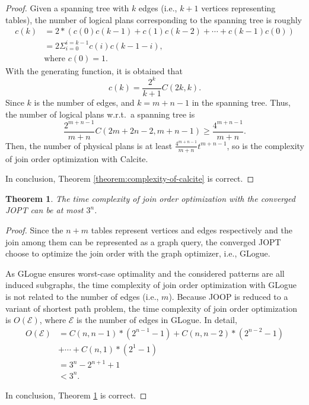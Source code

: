 \documentclass[sigconf, nonacm]{acmart}
\newtheorem{theorem}{Theorem}
\begin{document}
\begin{proof}
    Given a spanning tree with $k$ edges (i.e., $k+1$ vertices representing tables), the number of logical plans corresponding to the spanning tree is roughly
    \begin{equation*}
        \begin{split}
            c(k) & = 2 * (c(0)c(k-1) + c(1)c(k-2) + \cdots + c(k-1)c(0)) \\
            & = 2\Sigma_{i=0}^{i=k-1}c(i)c(k-1-i), \\
            & \text{where } c(0) = 1.
        \end{split}
    \end{equation*}
    With the generating function, it is obtained that 
    \begin{equation*}
        c(k) = \frac{2^k}{k+1}C(2k, k).
    \end{equation*}
    Since $k$ is the number of edges, and $k = m + n - 1$ in the spanning tree.
    Thus, the number of logical plans w.r.t.~a spanning tree is 
    \begin{equation*}
        \frac{2^{m+n-1}}{m+n}C(2m+2n-2, m+n-1) \geq \frac{4^{m+n-1}}{m+n}.
    \end{equation*}
   Then, the number of physical plans is at least $\frac{4^{m+n-1}}{m+n}t^{m+n-1}$, so is the complexity of join order optimization with Calcite.
   
   In conclusion, Theorem \ref{theorem:complexity-of-calcite} is correct.
\end{proof}

\begin{theorem}
    \label{theorem:complexity-of-glogue}
    The time complexity of join order optimization with the converged JOPT can be at most $3^n$.
\end{theorem}
\begin{proof}
    Since the $n + m$ tables represent vertices and edges respectively and the join among them can be represented as a graph query, the converged JOPT choose to optimize the join order with the graph optimizer, i.e., GLogue.

    As GLogue ensures worst-case optimality and the considered patterns are all induced subgraphs, the time complexity of join order optimization with GLogue is not related to the number of edges (i.e., $m$).
    Because JOOP is reduced to a variant of shortest path problem, the time complexity of join order optimization is $O(\mathcal{E})$, where $\mathcal{E}$ is the number of edges in GLogue.
    In detail, 
    \begin{equation*}
        \begin{split}
            O(\mathcal{E}) & = C(n, n-1)*(2^{n-1}-1) + C(n, n-2) * (2^{n-2}- 1) \\
            & + \cdots + C(n, 1) * (2^1 - 1) \\
            & = 3^n - 2^{n+1} +1 \\
            & < 3^n.
        \end{split}
    \end{equation*}
    
    In conclusion, Theorem \ref{theorem:complexity-of-glogue} is correct.
\end{proof}
\end{document}
